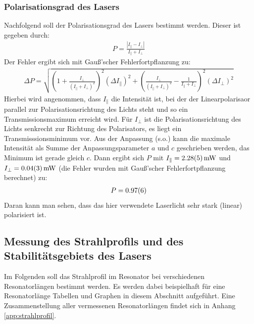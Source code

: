 \documentclass[11pt, a4paper]{article}
\numberwithin{equation}{section}
\begin{document}
\subsubsection{Polarisationsgrad des Lasers}
Nachfolgend soll der Polarisationsgrad des Lasers bestimmt werden.
Dieser ist gegeben durch:
\begin{align}
P=\frac{|I_{\parallel}-I_{\perp}|}{I_{\parallel}+I_{\perp}}
\end{align}
Der Fehler ergibt sich mit Gauß'scher Fehlerfortpflanzung zu:
\begin{align}
\Delta P=\sqrt{\left(1+\frac{I_{\perp}}{(I_{\parallel}+I_{\perp})^2}\right)^2\left(\Delta I_{\parallel}\right)^2 + \left(\frac{I_{\perp}}{(I_{\parallel}+I_{\perp})^2}-\frac{1}{I_{\parallel}+I_{\perp}}\right)^2\left(\Delta I_{\perp}\right)^2}
\end{align}
Hierbei wird angenommen, dass $I_\parallel$ die Intensität ist, bei der der Linearpolarisaor parallel zur Polarisationsrichtung des Lichts steht und so ein Transmissionsmaximum erreicht wird.
Für $I_\perp$ ist die Polarisationsrichtung des Lichts senkrecht zur Richtung des Polarisators, es liegt ein Transmisssionsminimum vor.
Aus der Anpassung (s.o.) kann die maximale Intensität als Summe der Anpassungsparameter $a$ und $c$ geschrieben werden, das Minimum ist gerade gleich $c$. 
Dann ergibt sich $P$ mit $I_\parallel=\SI{2.28+-0.05}{\milli\watt}$ und $I_\perp=\SI{0.04+-0.03}{\milli\watt}$ (die Fehler wurden mit Gauß'scher Fehlerfortpflanzung berechnet) zu:
\begin{align}
P=\num{0.97+-0.06}
\end{align}
Daran kann man sehen, dass das hier verwendete Laserlicht sehr stark (linear) polarisiert ist.

\subsection{Messung des Strahlprofils und des Stabilitätsgebiets des Lasers}
Im Folgenden soll das Strahlprofil im Resonator bei verschiedenen Resonatorlängen bestimmt werden.
Es werden dabei beispielhaft für eine Resonatorlänge Tabellen und Graphen in diesem Abschnitt aufgeführt.
Eine Zusammenstellung aller vermessenen Resonatorlängen findet sich in Anhang \ref{app:strahlprofil}.
\end{document}
